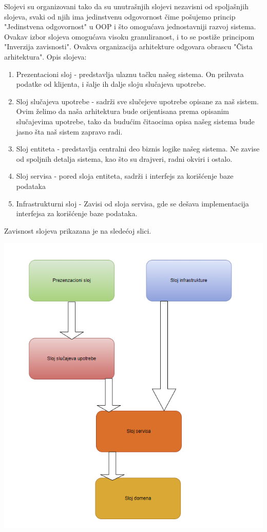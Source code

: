 \documentclass[a4paper]{article}
\begin{document}
Slojevi su organizovani tako da su unutrašnjih slojevi nezavisni od spoljašnjih slojeva, svaki od njih ima jedinstvenu odgovornost čime pošujemo princip "Jedinstvena odgovornost" u OOP i što omogućava jednostavniji razvoj sistema. Ovakav izbor slojeva omogućava visoku granuliranost, i to se postiže principom "Inverzija zavisnosti". Ovakva organizacija arhitekture odgovara obrascu "Čista arhitektura".
\newline
\newline
Opis slojeva:
\newline
\begin{enumerate}
    \item Prezentacioni sloj - predstavlja ulaznu tačku našeg sistema. On prihvata podatke od klijenta, i šalje ih dalje sloju slučajeva upotrebe.
    \item Sloj slučajeva upotrebe - sadrži sve slučejeve upotrebe opisane za naš sistem. Ovim želimo da naša arhitektura bude orijentisana prema opisanim slučajevima upotrebe, tako da budućim čitaocima opisa našeg sistema bude jasno šta naš sistem zapravo radi. 
    \item Sloj entiteta - predstavlja centralni deo biznis logike našeg sistema. Ne zavise od spoljnih detalja sistema, kao što su drajveri, radni okviri i ostalo.
    \item Sloj servisa - pored sloja entiteta, sadrži i interfejs za korišćenje baze podataka
    \item Infrastrukturni sloj - Zavisi od sloja servisa, gde se dešava implementacija interfejsa za korišćenje baze podataka.
\end{enumerate}



Zavisnost slojeva prikazana je na sledećoj slici.


\begin{center}
    \includegraphics[scale=0.5]{Arhitektura/zavisnostSlojeva.png}
\end{center}
\end{document}
